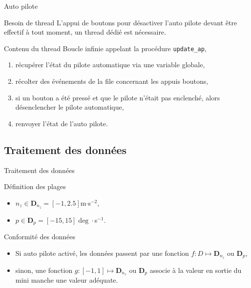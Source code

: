 \documentclass[footheight=2em]{beamer}
\begin{document}
\begin{frame}[t]{Auto pilote}
  \begin{block}{Besoin de thread}
    L'appui de boutons pour désactiver l'auto pilote devant être effectif à tout
    moment, un thread dédié est nécessaire.
  \end{block}
  \begin{block}{Contenu du thread}
    Boucle infinie appelant la procédure \texttt{update\_ap},
    \begin{enumerate}
      \item récupérer l'état du pilote automatique via une variable
        globale,
      \item récolter des événements de la file concernant les appuis boutons,
      \item si un bouton a été pressé et que le pilote n'était pas enclenché,
        alors désenclencher le pilote automatique,
      \item renvoyer l'état de l'auto pilote.
    \end{enumerate}
  \end{block}
\end{frame}

\subsection{Traitement des données}
\begin{frame}[t]{Traitement des données}
  \begin{block}{Définition des plages}
    \begin{itemize}
      \item \(n_z \in \mathbf{D}_{n_z} = [-1, 2.5]\)m\(\cdot\)s\(^{-2}\),
      \item \(p \in \mathbf{D}_p = [-15, 15]\deg\cdot\)s\(^{-1}\).
    \end{itemize}
  \end{block}
  \pause
  \begin{block}{Conformité des données}
    \begin{itemize}
      \item Si auto pilote activé, les données passent par une
        fonction \(f\colon D \mapsto \mathbf{D}_{n_z}\) ou \(\mathbf{D}_p\),
      \item sinon, une fonction \(g\colon[-1, 1] \mapsto \mathbf{D}_{n_z}\) ou
        \(\mathbf{D}_p\) associe à la valeur en sortie du mini manche une valeur
        adéquate.
    \end{itemize}
  \end{block}
\end{frame}
\end{document}
